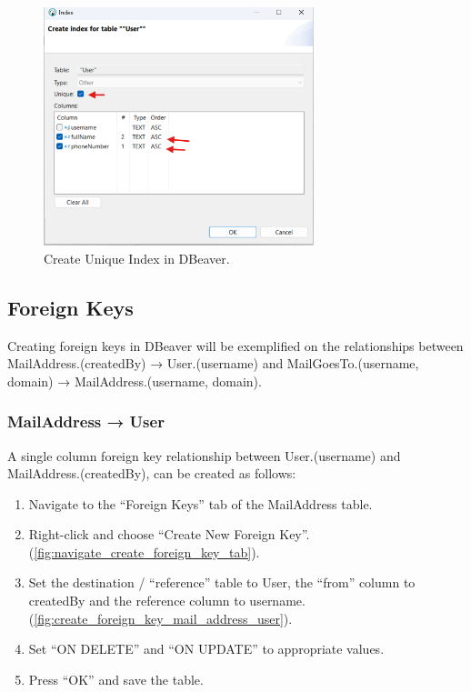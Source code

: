 \documentclass[a4paper,11pt,oneside]{article}
\begin{document}
\begin{sloppypar}
\begin{figure}[!htb]
  \centering
  \includegraphics[width=0.7\textwidth]{dbeaver/user_index_create.png}
  \caption{Create Unique Index in DBeaver.}
  \label{fig:user_index_create}
\end{figure}


\subsection{Foreign Keys}
\label{dbeaverForeignKeys}
Creating foreign keys in DBeaver will be exemplified on the relationships between MailAddress.(createdBy) → User.(username) and MailGoesTo.(username, domain) → MailAddress.(username, domain).

\subsubsection{MailAddress → User}
\label{dbeaverUserMailAddressRelationship}
A single column foreign key relationship between User.(username) and MailAddress.(createdBy), can be created as follows:

\begin{enumerate}
  \item Navigate to the ``Foreign Keys'' tab of the MailAddress table.
  \item Right-click and choose ``Create New Foreign Key''. (\autoref{fig:navigate_create_foreign_key_tab}).
  \item Set the destination / ``reference'' table to User, the ``from'' column to createdBy and the reference column to username. (\autoref{fig:create_foreign_key_mail_address_user}).
  \item Set ``ON DELETE'' and ``ON UPDATE'' to appropriate values.
  \item Press ``OK'' and save the table.
\end{enumerate}


\end{sloppypar}
\end{document}
